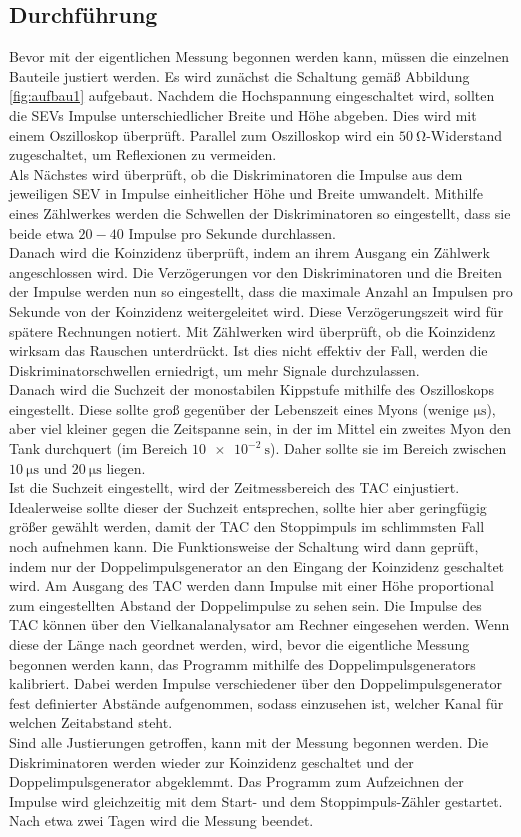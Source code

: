 \subsection{Durchführung}
\label{sec:durchführung}

Bevor mit der eigentlichen Messung begonnen werden kann, müssen die einzelnen Bauteile justiert werden.
Es wird zunächst die Schaltung gemäß Abbildung \ref{fig:aufbau1} aufgebaut.
Nachdem die Hochspannung eingeschaltet wird, sollten die SEVs Impulse unterschiedlicher Breite und Höhe abgeben.
Dies wird mit einem Oszilloskop überprüft.
Parallel zum Oszilloskop wird ein $\SI{50}{\ohm}$-Widerstand zugeschaltet, um Reflexionen zu vermeiden.\\
Als Nächstes wird überprüft, ob die Diskriminatoren die Impulse aus dem jeweiligen SEV in Impulse einheitlicher Höhe und Breite umwandelt.
Mithilfe eines Zählwerkes werden die Schwellen der Diskriminatoren so eingestellt, dass sie beide etwa $20-40$ Impulse pro Sekunde durchlassen.\\
Danach wird die Koinzidenz überprüft, indem an ihrem Ausgang ein Zählwerk angeschlossen wird.
Die Verzögerungen vor den Diskriminatoren und die Breiten der Impulse werden nun so eingestellt, dass die maximale Anzahl an Impulsen pro Sekunde von der Koinzidenz weitergeleitet wird.
Diese Verzögerungszeit wird für spätere Rechnungen notiert.
Mit Zählwerken wird überprüft, ob die Koinzidenz wirksam das Rauschen unterdrückt.
Ist dies nicht effektiv der Fall, werden die Diskriminatorschwellen erniedrigt, um mehr Signale durchzulassen.\\
Danach wird die Suchzeit der monostabilen Kippstufe mithilfe des Oszilloskops eingestellt.
Diese sollte groß gegenüber der Lebenszeit eines Myons (wenige $\si{\micro\second}$), aber viel kleiner gegen die Zeitspanne sein, in der im Mittel ein zweites Myon den Tank durchquert (im Bereich $\SI{10e-2}{\second}$).
Daher sollte sie im Bereich zwischen $\SI{10}{\micro\second}$ und $\SI{20}{\micro\second}$ liegen.\\
Ist die Suchzeit eingestellt, wird der Zeitmessbereich des TAC einjustiert.
Idealerweise sollte dieser der Suchzeit entsprechen, sollte hier aber geringfügig größer gewählt werden, damit der TAC den Stoppimpuls im schlimmsten Fall noch aufnehmen kann.
Die Funktionsweise der Schaltung wird dann geprüft, indem nur der Doppelimpulsgenerator an den Eingang der Koinzidenz geschaltet wird.
Am Ausgang des TAC werden dann Impulse mit einer Höhe proportional zum eingestellten Abstand der Doppelimpulse zu sehen sein.
Die Impulse des TAC können über den Vielkanalanalysator am Rechner eingesehen werden.
Wenn diese der Länge nach geordnet werden, wird, bevor die eigentliche Messung begonnen werden kann, das Programm mithilfe des Doppelimpulsgenerators kalibriert.
Dabei werden Impulse verschiedener über den Doppelimpulsgenerator fest definierter Abstände aufgenommen, sodass einzusehen ist, welcher Kanal für welchen Zeitabstand steht.\\
Sind alle Justierungen getroffen, kann mit der Messung begonnen werden.
Die Diskriminatoren werden wieder zur Koinzidenz geschaltet und der Doppelimpulsgenerator abgeklemmt.
Das Programm zum Aufzeichnen der Impulse wird gleichzeitig mit dem Start- und dem Stoppimpuls-Zähler gestartet.
Nach etwa zwei Tagen wird die Messung beendet.

